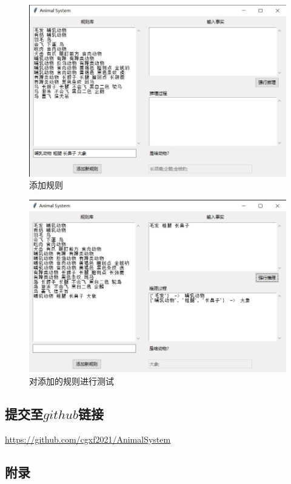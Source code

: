 \documentclass[a4paper]{article}   %
\begin{document}
 	\begin{figure}[!htbp]
 		\centering
 		\includegraphics[scale=0.75]{./resource/show2.jpg}
 		\caption{添加规则}
 	\end{figure}
 	\begin{figure}[!htbp]
 		\centering
 		\includegraphics[scale=0.75]{./resource/show3.jpg}
 		\caption{对添加的规则进行测试}
 	\end{figure}
 	\subsection*{提交至$ github $链接}
 	\noindent
 	\href{https://github.com/cgxf2021/AnimalSystem}{https://github.com/cgxf2021/AnimalSystem} 
 	\subsection*{附录}
 	
 	
 	
\end{document}
